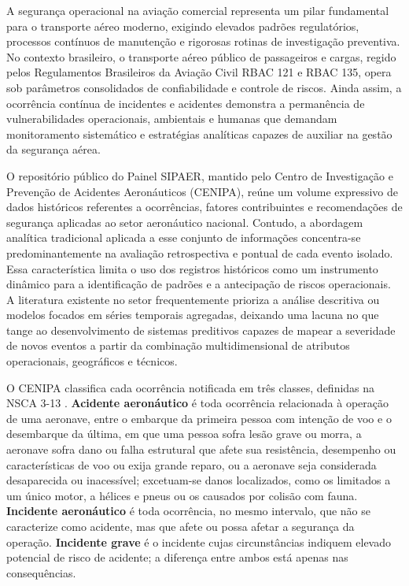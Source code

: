 \documentclass[12pt]{article}
\begin{document}
A segurança operacional na aviação comercial representa um pilar fundamental para o transporte aéreo moderno, exigindo elevados padrões regulatórios, processos contínuos de manutenção e rigorosas rotinas de investigação preventiva. No contexto brasileiro, o transporte aéreo público de passageiros e cargas, regido pelos Regulamentos Brasileiros da Aviação Civil RBAC 121 e RBAC 135, opera sob parâmetros consolidados de confiabilidade e controle de riscos. Ainda assim, a ocorrência contínua de incidentes e acidentes demonstra a permanência de vulnerabilidades operacionais, ambientais e humanas que demandam monitoramento sistemático e estratégias analíticas capazes de auxiliar na gestão da segurança aérea.

O repositório público do Painel SIPAER, mantido pelo Centro de Investigação e Prevenção de Acidentes Aeronáuticos (CENIPA), reúne um volume expressivo de dados históricos referentes a ocorrências, fatores contribuintes e recomendações de segurança aplicadas ao setor aeronáutico nacional. Contudo, a abordagem analítica tradicional aplicada a esse conjunto de informações concentra-se predominantemente na avaliação retrospectiva e pontual de cada evento isolado. Essa característica limita o uso dos registros históricos como um instrumento dinâmico para a identificação de padrões e a antecipação de riscos operacionais. A literatura existente no setor frequentemente prioriza a análise descritiva ou modelos focados em séries temporais agregadas, deixando uma lacuna no que tange ao desenvolvimento de sistemas preditivos capazes de mapear a severidade de novos eventos a partir da combinação multidimensional de atributos operacionais, geográficos e técnicos.

O CENIPA classifica cada ocorrência notificada em três classes, definidas na NSCA 3-13 \cite{brasil:nsca313}. \textbf{Acidente aeronáutico} é toda ocorrência relacionada à operação de uma aeronave, entre o embarque da primeira pessoa com intenção de voo e o desembarque da última, em que uma pessoa sofra lesão grave ou morra, a aeronave sofra dano ou falha estrutural que afete sua resistência, desempenho ou características de voo ou exija grande reparo, ou a aeronave seja considerada desaparecida ou inacessível; excetuam-se danos localizados, como os limitados a um único motor, a hélices e pneus ou os causados por colisão com fauna. \textbf{Incidente aeronáutico} é toda ocorrência, no mesmo intervalo, que não se caracterize como acidente, mas que afete ou possa afetar a segurança da operação. \textbf{Incidente grave} é o incidente cujas circunstâncias indiquem elevado potencial de risco de acidente; a diferença entre ambos está apenas nas consequências.
\end{document}

